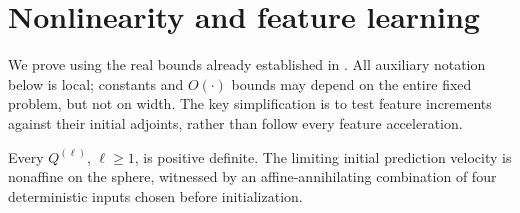 \section{Nonlinearity and feature learning}
\label{sec:nonlinear-learning-proof}

We prove  using the real bounds already
established in . All auxiliary notation below is local;
constants and $O(\cdot)$ bounds may depend on the entire fixed problem,
but not on width. The key simplification is to test feature increments
against their initial adjoints, rather than follow every feature acceleration.

\begin{lemma}
\label{fl:input-lemma}
Every $Q^{(\ell)}$, $\ell\ge1$, is positive definite. The limiting initial
prediction velocity is nonaffine on the sphere, witnessed by an affine-annihilating
combination of four deterministic inputs chosen before initialization.
\end{lemma}
